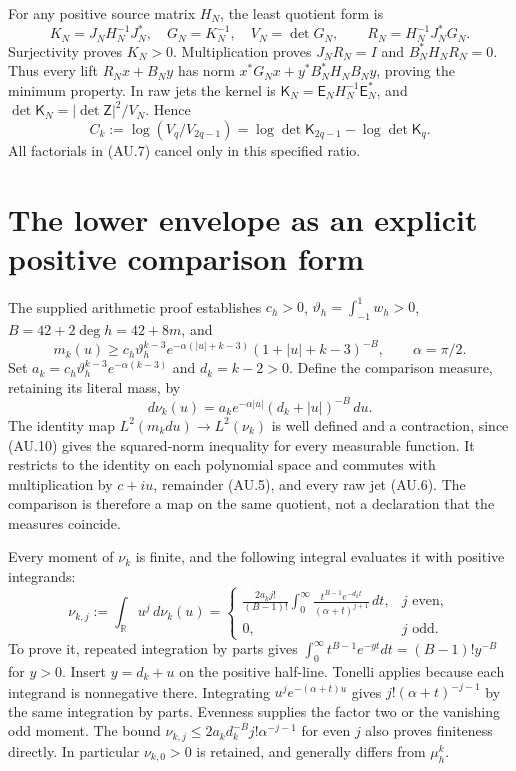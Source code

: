 \documentclass[11pt]{article}
\newcommand{\R}{\mathbb R}
\begin{document}
For any positive source matrix $H_N$, the least quotient form is
\[
 K_N=J_NH_N^{-1}J_N^*,\quad G_N=K_N^{-1},\quad V_N=\det G_N,
 \qquad R_N=H_N^{-1}J_N^*G_N.                               \tag{AU.8}
\]
Surjectivity proves $K_N>0$. Multiplication proves $J_NR_N=I$ and
$B_N^*H_NR_N=0$. Thus every lift $R_Nx+B_Ny$ has norm
$x^*G_Nx+y^*B_N^*H_NB_Ny$, proving the minimum property.
In raw jets the kernel is $\mathsf K_N=\mathsf E_NH_N^{-1}\mathsf E_N^*$,
and $\det\mathsf K_N=|\det\mathsf Z|^2/V_N$. Hence
\[
 C_k:=\log(V_q/V_{2q-1})
      =\log\det\mathsf K_{2q-1}-\log\det\mathsf K_q.
 \tag{AU.9}
\]
All factorials in (AU.7) cancel only in this specified ratio.

\section{The lower envelope as an explicit positive comparison form}

The supplied arithmetic proof establishes $c_h>0$,
$\vartheta_h=\int_{-1}^1w_h>0$, $B=42+2\deg h=42+8m$, and
\[
 m_k(u)\ge c_h\vartheta_h^{k-3}
 e^{-\alpha(|u|+k-3)}(1+|u|+k-3)^{-B},\qquad\alpha=\pi/2.
 \tag{AU.10}
\]
Set $a_k=c_h\vartheta_h^{k-3}e^{-\alpha(k-3)}$ and $d_k=k-2>0$.
Define the comparison measure, retaining its literal mass, by
\[
 d\nu_k(u)=a_k e^{-\alpha|u|}(d_k+|u|)^{-B}\,du.
 \tag{AU.11}
\]
The identity map $L^2(m_kdu)\to L^2(\nu_k)$ is well defined and a
contraction, since (AU.10) gives the squared-norm inequality for every
measurable function. It restricts to the identity on each polynomial
space and commutes with multiplication by $c+iu$, remainder (AU.5),
and every raw jet (AU.6). The comparison is therefore a map on the same
quotient, not a declaration that the measures coincide.

Every moment of $\nu_k$ is finite, and the following integral evaluates
it with positive integrands:
\[
 \nu_{k,j}:=\int_\R u^j\,d\nu_k(u)=
 \begin{cases}
 \displaystyle\frac{2a_kj!}{(B-1)!}
 \int_0^\infty\frac{t^{B-1}e^{-d_kt}}{(\alpha+t)^{j+1}}\,dt,
   &j\text{ even},\\
 0,&j\text{ odd}.
 \end{cases}                                                \tag{AU.12}
\]
To prove it, repeated integration by parts gives
$\int_0^\infty t^{B-1}e^{-yt}dt=(B-1)!y^{-B}$ for $y>0$.
Insert $y=d_k+u$ on the positive half-line. Tonelli applies because
each integrand is nonnegative there. Integrating $u^je^{-(\alpha+t)u}$
gives $j!(\alpha+t)^{-j-1}$ by the same integration by parts. Evenness
supplies the factor two or the vanishing odd moment. The bound
$\nu_{k,j}\le2a_kd_k^{-B}j!\alpha^{-j-1}$ for even $j$ also proves
finiteness directly. In particular $\nu_{k,0}>0$ is retained, and
generally differs from $\mu_h^k$.
\end{document}
